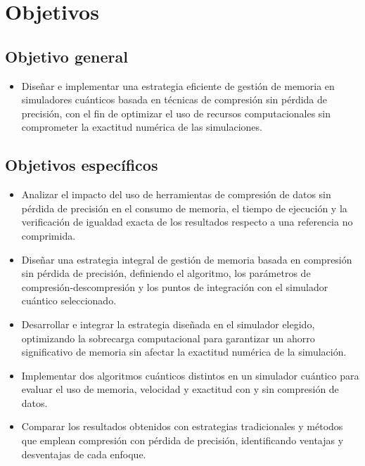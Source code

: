 \section{Objetivos}
\subsection{Objetivo general}
\begin{itemize}

    \item Diseñar e implementar una estrategia eficiente de gestión de memoria en simuladores cuánticos basada en técnicas de compresión sin pérdida de precisión, con el fin de optimizar el uso de recursos computacionales sin comprometer la exactitud numérica de las simulaciones.

\end{itemize}

\subsection{Objetivos específicos}

\begin{itemize}
    \item Analizar el impacto del uso de herramientas de compresión de datos sin pérdida de precisión en el consumo de memoria, el tiempo de ejecución y la verificación de igualdad exacta de los resultados respecto a una referencia no comprimida.
    \item Diseñar una estrategia integral de gestión de memoria basada en compresión sin pérdida de precisión, definiendo el algoritmo, los parámetros de compresión‑descompresión y los puntos de integración con el simulador cuántico seleccionado.
    \item Desarrollar e integrar la estrategia diseñada en el simulador elegido, optimizando la sobrecarga computacional para garantizar un ahorro significativo de memoria sin afectar la exactitud numérica de la simulación.
    \item Implementar dos algoritmos cuánticos distintos en un simulador cuántico para evaluar el uso de memoria, velocidad y exactitud con y sin compresión de datos.
    \item Comparar los resultados obtenidos con estrategias tradicionales y métodos que emplean compresión con pérdida de precisión, identificando ventajas y desventajas de cada enfoque.
\end{itemize}
